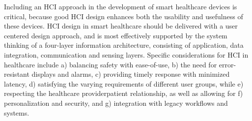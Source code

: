 \documentclass[letterpaper,12pt]{article}
\begin{document}
Including an HCI approach in the development of smart healthcare devices is critical, because good HCI design enhances
both the usability and usefulness of these devices. HCI design in smart healthcare should be delivered with a user centered
design approach, and is most effectively supported by the system thinking of a four-layer information architecture, consisting of
application, data integration, communication and sensing layers. Specific considerations for HCI in healthcare include a)
balancing safety with ease-of-use, b) the need for error-resistant displays and alarms, c) providing timely response with
minimized latency, d) satisfying the varying requirements of different user groups, while e) respecting the healthcare providerpatient relationship, as well as allowing for f) personalization and security, and g) integration with legacy workflows and
systems.
\end{document}
